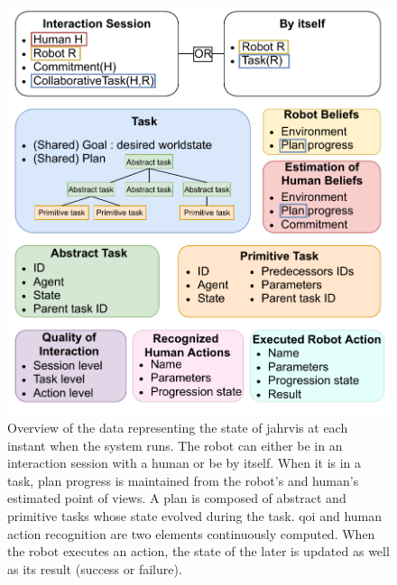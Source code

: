 \documentclass[a4paper,11pt,twoside]{StyleThese}
\begin{document}
\begin{figure}[!ht]
	\includegraphics[width=\linewidth]{figures/chapter2/data_state_representation.pdf}
	\caption{Overview of the data representing the state of \acrshort{jahrvis} at each instant when the system runs. The robot can either be in an interaction session with a human or be by itself. When it is in a task, plan progress is maintained from the robot's and human's estimated point of views. A plan is composed of abstract and primitive tasks whose state evolved during the task. \acrshort{qoi} and human action recognition are two elements continuously computed. When the robot executes an action, the state of the later is updated as well as its result (success or failure).}
	\label{chap5:fig:data_state}
\end{figure}
\end{document}
